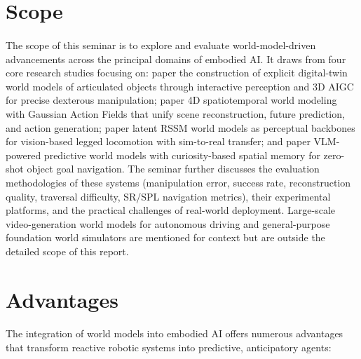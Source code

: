 \documentclass[12pt,a4paper,final]{extreport}
\begin{document}
\section{Scope}

\paragraph{} The scope of this seminar is to explore and evaluate world-model-driven advancements across the principal domains of embodied AI. It draws from four core research studies focusing on: paper \cite{p1} the construction of explicit digital-twin world models of articulated objects through interactive perception and 3D AIGC for precise dexterous manipulation; paper \cite{p2} 4D spatiotemporal world modeling with Gaussian Action Fields that unify scene reconstruction, future prediction, and action generation; paper \cite{p3} latent RSSM world models as perceptual backbones for vision-based legged locomotion with sim-to-real transfer; and paper \cite{p4} VLM-powered predictive world models with curiosity-based spatial memory for zero-shot object goal navigation. The seminar further discusses the evaluation methodologies of these systems (manipulation error, success rate, reconstruction quality, traversal difficulty, SR/SPL navigation metrics), their experimental platforms, and the practical challenges of real-world deployment. Large-scale video-generation world models for autonomous driving and general-purpose foundation world simulators are mentioned for context but are outside the detailed scope of this report.

\section{Advantages}

\paragraph{} The integration of world models into embodied AI offers numerous advantages that transform reactive robotic systems into predictive, anticipatory agents:
\end{document}
